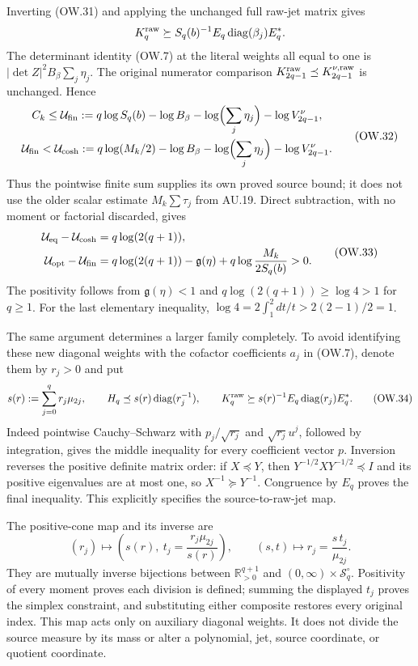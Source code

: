 \documentclass[11pt]{article}
\newcommand{\R}{\mathbb R}
\newcommand{\diag}{\operatorname{diag}}
\begin{document}
Inverting (OW.31) and applying the unchanged full raw-jet matrix gives
\[
 K_q^{\rm raw}\succeq S_q(b)^{-1}E_q\diag(\beta_j)E_q^*.
\]
The determinant identity (OW.7) at the literal weights all equal to one
is $|\det Z|^2B_\beta\sum_j\eta_j$. The original numerator comparison
$K_{2q-1}^{\rm raw}\preceq K_{2q-1}^{\nu,\rm raw}$ is unchanged. Hence
\[
 \begin{gathered}
 C_k\le\mathcal U_{\rm fin}:=
 q\log S_q(b)-\log B_\beta-\log\Bigl(\sum_j\eta_j\Bigr)
                       -\log V_{2q-1}^\nu,\\
 \mathcal U_{\rm fin}<\mathcal U_{\rm cosh}:=
 q\log(M_k/2)-\log B_\beta-\log\Bigl(\sum_j\eta_j\Bigr)
                       -\log V_{2q-1}^\nu.
 \end{gathered}                                                \tag{OW.32}
\]
Thus the pointwise finite sum supplies its own proved source bound; it
does not use the older scalar estimate $M_k\sum\tau_j$ from AU.19.
Direct subtraction, with no moment or factorial discarded, gives
\[
 \begin{split}
 \mathcal U_{\rm eq}-\mathcal U_{\rm cosh}
      &=q\log(2(q+1)),\\
 \mathcal U_{\rm opt}-\mathcal U_{\rm fin}
      &=q\log(2(q+1))-\mathfrak g(\eta)
                +q\log\frac{M_k}{2S_q(b)}>0.
 \end{split}                                                  \tag{OW.33}
\]
The positivity follows from $\mathfrak g(\eta)<1$ and
$q\log(2(q+1))\ge\log4>1$ for $q\ge1$.
For the last elementary inequality,
$\log4=2\int_1^2dt/t>2(2-1)/2=1$.

The same argument determines a larger family completely. To avoid
identifying these new diagonal weights with the cofactor coefficients
$a_j$ in (OW.7), denote them by $r_j>0$ and put
\[
 s(r):=\sum_{j=0}^qr_j\mu_{2j},\qquad
 H_q\preceq s(r)\diag(r_j^{-1}),\qquad
 K_q^{\rm raw}\succeq s(r)^{-1}E_q\diag(r_j)E_q^*.
 \tag{OW.34}
\]
Indeed pointwise Cauchy--Schwarz with $p_j/\sqrt{r_j}$ and
$\sqrt{r_j}u^j$, followed by integration, gives the middle inequality
for every coefficient vector $p$. Inversion reverses the positive
definite matrix order: if $X\preceq Y$, then
$Y^{-1/2}XY^{-1/2}\preceq I$ and its positive eigenvalues are at most
one, so $X^{-1}\succeq Y^{-1}$. Congruence by $E_q$ proves the final
inequality. This explicitly specifies the source-to-raw-jet map.

The positive-cone map and its inverse are
\[
 (r_j)\longmapsto\left(s(r),\ t_j=\frac{r_j\mu_{2j}}{s(r)}\right),
 \qquad (s,t)\longmapsto r_j=\frac{s\,t_j}{\mu_{2j}}.
 \tag{OW.35}
\]
They are mutually inverse bijections between $\R_{>0}^{q+1}$ and
$(0,\infty)\times\mathcal S_q^\circ$. Positivity of every moment
proves each division is defined; summing the displayed $t_j$ proves
the simplex constraint, and substituting either composite restores
every original index. This map acts only on auxiliary diagonal weights.
It does not divide the source measure by its mass or alter a polynomial,
jet, source coordinate, or quotient coordinate.
\end{document}
